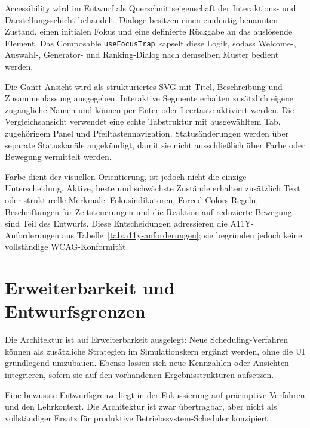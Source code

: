 Accessibility wird im Entwurf als Querschnittseigenschaft der Interaktions- und Darstellungsschicht behandelt. Dialoge besitzen einen eindeutig benannten Zustand, einen initialen Fokus und eine definierte Rückgabe an das auslösende Element. Das Composable \texttt{useFocusTrap} kapselt diese Logik, sodass Welcome-, Auswahl-, Generator- und Ranking-Dialog nach demselben Muster bedient werden.

Die Gantt-Ansicht wird als strukturiertes SVG mit Titel, Beschreibung und Zusammenfassung ausgegeben. Interaktive Segmente erhalten zusätzlich eigene zugängliche Namen und können per Enter oder Leertaste aktiviert werden. Die Vergleichsansicht verwendet eine echte Tabstruktur mit ausgewähltem Tab, zugehörigem Panel und Pfeiltastennavigation. Statusänderungen werden über separate Statuskanäle angekündigt, damit sie nicht ausschließlich über Farbe oder Bewegung vermittelt werden.

Farbe dient der visuellen Orientierung, ist jedoch nicht die einzige Unterscheidung. Aktive, beste und schwächste Zustände erhalten zusätzlich Text oder strukturelle Merkmale. Fokusindikatoren, Forced-Colors-Regeln, Beschriftungen für Zeitsteuerungen und die Reaktion auf reduzierte Bewegung sind Teil des Entwurfs. Diese Entscheidungen adressieren die A11Y-Anforderungen aus Tabelle~\ref{tab:a11y-anforderungen}; sie begründen jedoch keine vollständige WCAG-Konformität.

\section{Erweiterbarkeit und Entwurfsgrenzen}

Die Architektur ist auf Erweiterbarkeit ausgelegt: Neue Scheduling-Verfahren können als zusätzliche Strategien im Simulationskern ergänzt werden, ohne die UI grundlegend umzubauen. Ebenso lassen sich neue Kennzahlen oder Ansichten integrieren, sofern sie auf den vorhandenen Ergebnisstrukturen aufsetzen.

Eine bewusste Entwurfsgrenze liegt in der Fokussierung auf präemptive Verfahren und den Lehrkontext. Die Architektur ist zwar übertragbar, aber nicht als vollständiger Ersatz für produktive Betriebssystem-Scheduler konzipiert.